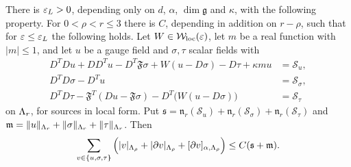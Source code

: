 \begin{proposition}\label{prop:system-interior}
There is $\varepsilon_L>0$, depending only on $d$, $\alpha$, $\dim\mathfrak g$ and $\kappa$, with the following property. For $0<\rho<r\le3$ there is $C$, depending in addition on $r-\rho$, such that for $\varepsilon\le\varepsilon_L$ the following holds. Let $W\in\mathcal W_{\rm loc}(\varepsilon)$, let $m$ be a real function with $|m|\le1$, and let $u$ be a gauge field and $\sigma,\tau$ scalar fields with
\begin{equation}\label{eq:system}
\begin{aligned}
D^TDu+DD^Tu-D^T\mathfrak F\sigma+W(u-D\sigma)-D\tau+\kappa mu&=\mathcal S_u,\\
D^TD\sigma-D^Tu&=\mathcal S_\sigma,\\
D^TD\tau-\mathfrak F^T(Du-\mathfrak F\sigma)-D^T\big(W(u-D\sigma)\big)&=\mathcal S_\tau
\end{aligned}
\end{equation}
on $\Lambda_r$, for sources in local form. Put $\mathfrak s=\mathfrak n_r(\mathcal S_u)+\mathfrak n_r(\mathcal S_\sigma)+\mathfrak n_r(\mathcal S_\tau)$ and $\mathfrak m=\|u\|_{\Lambda_r}+\|\sigma\|_{\Lambda_r}+\|\tau\|_{\Lambda_r}$. Then
\[
\sum_{v\in\{u,\sigma,\tau\}}\Big(|v|_{\Lambda_\rho}+|\partial v|_{\Lambda_\rho}+[\partial v]_{\alpha,\Lambda_\rho}\Big)\le C(\mathfrak s+\mathfrak m).
\]
\end{proposition}

